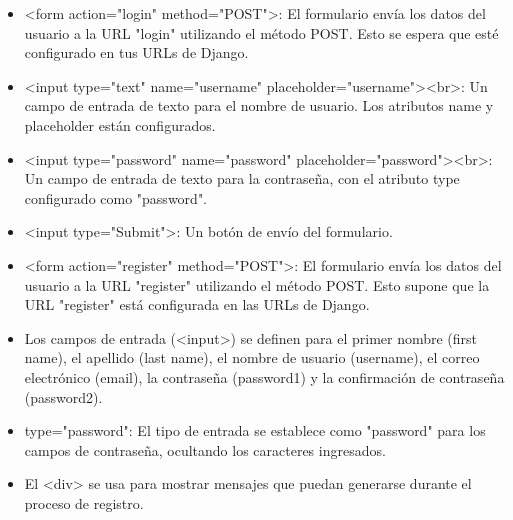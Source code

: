 
\begin{itemize}
        \item <form action="login" method="POST">: El formulario envía los datos del usuario a la URL "login" utilizando el método POST. Esto se espera que esté configurado en tus URLs de Django.
        \item <input type="text" name="username" placeholder="username"><br>: Un campo de entrada de texto para el nombre de usuario. Los atributos name y placeholder están configurados.
        \item <input type="password" name="password" placeholder="password"><br>: Un campo de entrada de texto para la contraseña, con el atributo type configurado como "password".
        \item <input type="Submit">: Un botón de envío del formulario.
\end{itemize}

\begin{itemize}
        \item <form action="register" method="POST">: El formulario envía los datos del usuario a la URL "register" utilizando el método POST. Esto supone que la URL "register" está configurada en las URLs de Django.
        \item Los campos de entrada (<input>) se definen para el primer nombre (first name), el apellido (last name), el nombre de usuario (username), el correo electrónico (email), la contraseña (password1) y la confirmación de contraseña (password2).
        \item type="password": El tipo de entrada se establece como "password" para los campos de contraseña, ocultando los caracteres ingresados.
        \item El <div> se usa para mostrar mensajes que puedan generarse durante el proceso de registro.
\end{itemize}
